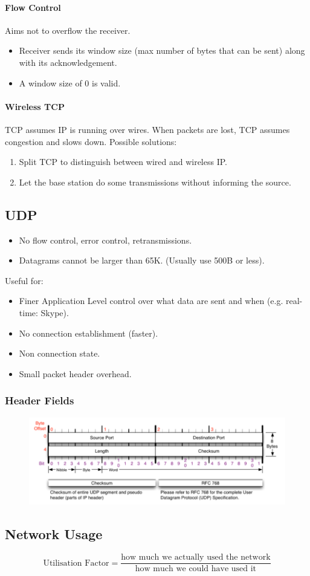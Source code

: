 \documentclass[twocolumn,english]{article}
\begin{document}
\paragraph{Flow Control}

Aims not to overflow the receiver.
\begin{itemize}
\item Receiver sends its window size (max number of bytes that can be sent)
along with its acknowledgement.
\item A window size of 0 is valid.
\end{itemize}

\paragraph{Wireless TCP}

TCP assumes IP is running over wires. When packets are lost, TCP assumes
congestion and slows down. Possible solutions:
\begin{enumerate}
\item Split TCP to distinguish between wired and wireless IP.
\item Let the base station do some transmissions without informing the source.
\end{enumerate}

\subsection{UDP}
\begin{itemize}
\item No flow control, error control, retransmissions.
\item Datagrams cannot be larger than 65K. (Usually use 500B or less).
\end{itemize}
Useful for:
\begin{itemize}
\item Finer Application Level control over what data are sent and when (e.g.
real-time: Skype).
\item No connection establishment (faster).
\item Non connection state.
\item Small packet header overhead.
\end{itemize}

\subsubsection*{Header Fields}

\begin{figure}[H]
\centering{}\includegraphics[width=0.75\linewidth]{img/udp}
\end{figure}

\subsection{Network Usage}

\[
\text{Utilisation Factor}=\frac{\text{how much we actually used the network}}{\text{how much we could have used it}}
\]
\end{document}
